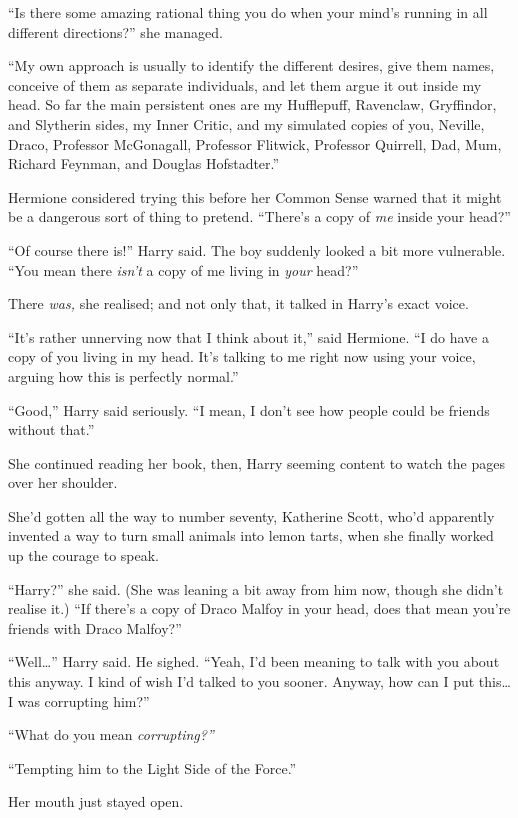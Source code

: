 ``Is there some amazing rational thing you do when your mind's running
in all different directions?'' she managed.

``My own approach is usually to identify the different desires, give
them names, conceive of them as separate individuals, and let them argue
it out inside my head. So far the main persistent ones are my
Hufflepuff, Ravenclaw, Gryffindor, and Slytherin sides, my Inner Critic,
and my simulated copies of you, Neville, Draco, Professor McGonagall,
Professor Flitwick, Professor Quirrell, Dad, Mum, Richard Feynman, and
Douglas Hofstadter.''

Hermione considered trying this before her Common Sense warned that it
might be a dangerous sort of thing to pretend. ``There's a copy of
\emph{me} inside your head?''

``Of course there is!'' Harry said. The boy suddenly looked a bit more
vulnerable. ``You mean there \emph{isn't} a copy of me living in
\emph{your} head?''

There \emph{was,} she realised; and not only that, it talked in Harry's
exact voice.

``It's rather unnerving now that I think about it,'' said Hermione. ``I
do have a copy of you living in my head. It's talking to me right now
using your voice, arguing how this is perfectly normal.''

``Good,'' Harry said seriously. ``I mean, I don't see how people could
be friends without that.''

She continued reading her book, then, Harry seeming content to watch the
pages over her shoulder.

She'd gotten all the way to number seventy, Katherine Scott, who'd
apparently invented a way to turn small animals into lemon tarts, when
she finally worked up the courage to speak.

``Harry?'' she said. (She was leaning a bit away from him now, though
she didn't realise it.) ``If there's a copy of Draco Malfoy in your
head, does that mean you're friends with Draco Malfoy?''

``Well\ldots{}'' Harry said. He sighed. ``Yeah, I'd been meaning to talk
with you about this anyway. I kind of wish I'd talked to you sooner.
Anyway, how can I put this\ldots{} I was corrupting him?''

``What do you mean \emph{corrupting?''}

``Tempting him to the Light Side of the Force.''

Her mouth just stayed open.


